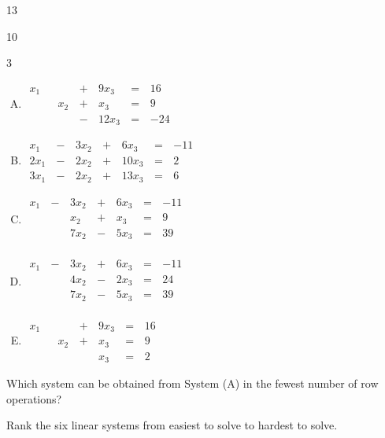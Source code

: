 \begin{applicationActivities}{1}{3}
\begin{activity}{10}
\begin{multicols}{3}
\begin{enumerate}[(A)]
	\item \(
		\begin{alignedat}{4}
	   		x_1 &     &      &\,+\,& 9x_3 &\,=\,& 16 \\
	       		&     & x_2 &\,+\,& x_3 &\,=\,& 9 \\
	       		&     &      &\,-\,& 12x_3 &\,=\,& -24 
		\end{alignedat}
	\)   
   
   \item \(
		\begin{alignedat}{4}
    		x_1 &\,-\,& 3x_2 &\,+\,&  6x_3 &\,=\,& -11 \\
		   2x_1 &\,-\,& 2x_2 &\,+\,& 10x_3 &\,=\,& 2 \\
		   3x_1 &\,-\,& 2x_2 &\,+\,& 13x_3 &\,=\,& 6 
    	\end{alignedat}
	\)


   	\item \(
		\begin{alignedat}{4}
	   		x_1 &\,-\,& 3x_2 &\,+\,& 6x_3 &\,=\,& -11 \\
	   		    &     & x_2 &\,+\,& x_3 &\,=\,& 9 \\
	   		    &     & 7x_2 &\,-\,& 5x_3 &\,=\,& 39 \\
		\end{alignedat}
	\)

   	\item \(
		\begin{alignedat}{4}
	   		x_1 &\,-\,& 3x_2 &\,+\,& 6x_3 &\,=\,& -11 \\
	   		    &     & 4x_2 &\,-\,& 2x_3 &\,=\,& 24 \\
	   		    &     & 7x_2 &\,-\,& 5x_3 &\,=\,& 39 \\
		\end{alignedat}
	\)

 	
	
	\item \(
		\begin{alignedat}{4}
	   		x_1 &     &      &\,+\,& 9x_3 &\,=\,& 16 \\
	       		&     & x_2 &\,+\,& x_3 &\,=\,& 9 \\
	       		&     &      &\,\,& x_3 &\,=\,& 2 
		\end{alignedat}
	\)
	\end{enumerate}
    \end{multicols}
  \begin{subactivity}
	Which system can be obtained from System (A) in the fewest number of row operations?
  \end{subactivity}
  \begin{subactivity}
    Rank the six linear systems from easiest to solve to hardest to solve.
  \end{subactivity}
\end{activity}


\end{applicationActivities}
